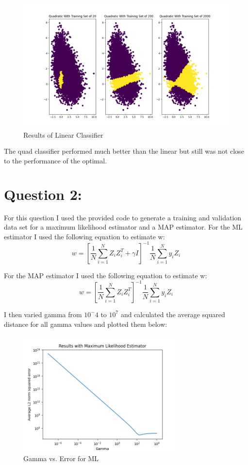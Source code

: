 \documentclass[11pt]{article}
\begin{document}
\begin{figure}[H]
	\centering
	\includegraphics[width=1.0\textwidth]{quad_data}
	\caption{Results of Linear Classifier}
\end{figure}

The quad classifier performed much better than the linear but still was not close to the performance of the optimal.

\section*{Question 2:}
For this question I used the provided code to generate a training and validation data set for a maximum likelihood estimator and a MAP estimator.
For the ML estimator I used the following equation to estimate w:
\[
	w = [\frac{1}{N}\sum_{i=1}^{N}Z_iZ_i^T + \gamma I]^{-1} \frac{1}{N}\sum_{i=1}^{N}y_iZ_i
\]

For the MAP estimator I used the following equation to estimate w:
\[
	w = [\frac{1}{N}\sum_{i=1}^{N}Z_iZ_i^T]^{-1} \frac{1}{N}\sum_{i=1}^{N}y_iZ_i
\]

I then varied gamma from $10^-4$ to $10^7$ and calculated the average squared distance for all gamma values and plotted them below:

\begin{figure}[H]
	\centering
	\includegraphics[width=0.75\textwidth]{ml_gamma}
	\caption{Gamma vs. Error for ML}
\end{figure}
\end{document}
